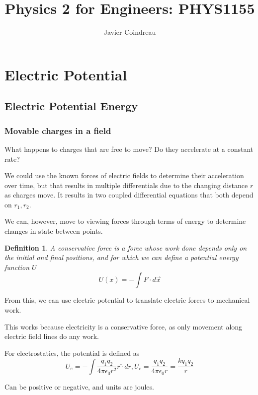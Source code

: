 \documentclass{article}
\title{Physics 2 for Engineers: PHYS1155}
\author{Javier Coindreau}
\newtheorem{definition}{Definition}
\begin{document}
\begin{titlepage}
	\maketitle
	\tableofcontents{}
\end{titlepage}
\section{Electric Potential}
\subsection{Electric Potential Energy}
\subsubsection{Movable charges in a field}

What happens to charges that are free to move? Do they accelerate at a constant rate?

We could use the known forces of electric fields to determine their acceleration over time, but that results in multiple differentials due to the changing distance $r$ as charges move. It results in two coupled differential equations that both depend on $r_1,r_2$.

We can, however, move to viewing forces through terms of energy to determine changes in state between points.

\begin{definition}
	A conservative force is a force whose work done depends only on the initial and final positions, and for which we can define a potential energy function $U$
	\begin{equation} U(x)=-\int{F \cdot d\vec{x}} \end{equation}
\end{definition}

From this, we can use electric potential to translate electric forces to mechanical work.

This works because electricity is a conservative force, as only movement along electric field lines do any work.

For electrostatics, the potential is defined as 
\begin{equation} U_e=-\int{\frac{q_1 q_2}{4\pi\epsilon_0 r^2} r\hat \cdot dr}, U_e=\frac{q_1 q_2}{4\pi\epsilon_0 r}=\frac{kq_1 q_2}{r}
\end{equation}

Can be positive or negative, and units are joules.
\end{document}
